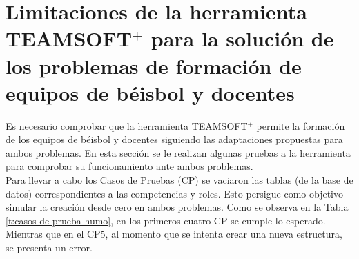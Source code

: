 \section{Limitaciones de la herramienta TEAMSOFT$^+$ para la solución de los problemas de formación de equipos de béisbol y docentes} \label{sec:limitaciones}

Es necesario comprobar que la herramienta TEAMSOFT$^+$ permite la formación de los equipos de béisbol y docentes siguiendo las adaptaciones propuestas para ambos problemas. En esta sección se le realizan algunas pruebas a la herramienta para comprobar su funcionamiento ante ambos problemas. \\

Para llevar a cabo los Casos de Pruebas (CP) se vaciaron las tablas (de la base de datos) correspondientes a las competencias y roles. Esto persigue como objetivo simular la creación desde cero en ambos problemas. Como se observa en la Tabla \ref{t:casos-de-prueba-humo}, en los primeros cuatro CP se cumple lo esperado. Mientras que en el CP5, al momento que se intenta crear una nueva estructura, se presenta un error.

